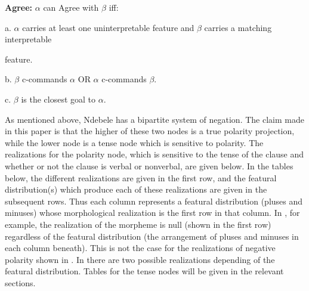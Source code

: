 \documentclass[output=paper]{langsci/langscibook}
\begin{document}
\begin{exe}
\ex\label{ex:burkholder:3}  
\textbf{Agree:} $\alpha$ can Agree with $\beta$ iff:


a. $\alpha$ carries at least one uninterpretable feature and $\beta$ carries a matching interpretable 

feature.


b. $\beta$ c-commands $\alpha$ OR $\alpha$ c-commands $\beta$.


c. $\beta$ is the closest goal to $\alpha$.
\end{exe}

As mentioned above, Ndebele has a bipartite system of negation. The claim made in this paper is that the higher of these two nodes is a true polarity projection, while the lower node is a tense node which is sensitive to polarity. The realizations for the polarity node, which is sensitive to the tense of the clause and whether or not the clause is verbal or nonverbal, are given below. In the tables below, the different realizations are given in the first row, and the featural distribution(s) which produce each of these realizations are given in the subsequent rows. Thus each column represents a featural distribution (pluses and minuses) whose morphological realization is the first row in that column. In , for example, the realization of the morpheme is null (shown in the first row) regardless of the featural distribution (the arrangement of pluses and minuses in each column beneath). This is not the case for the realizations of negative polarity shown in . In  there are two possible realizations depending of the featural distribution. Tables for the tense nodes will be given in the relevant sections.

\end{document}
